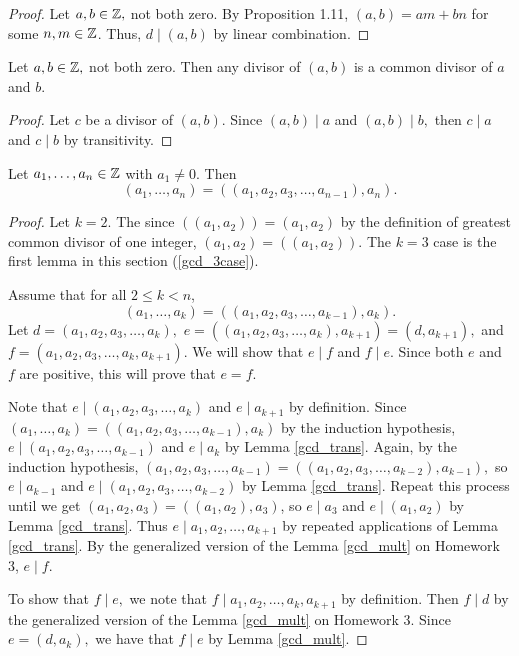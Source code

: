 \documentclass{ximera}
\begin{document}
 \begin{proof}
 	Let $a,b\in\mathbb Z,$ not both zero. By Proposition 1.11, $(a,b)=am+bn$ for some $n,m\in\mathbb Z$. Thus, $d\mid (a,b)$ by linear combination.
 \end{proof}

\begin{lem}\label{gcd_trans}
 	Let $a,b\in\mathbb Z,$ not both zero. Then any divisor of $(a,b)$ is a common divisor of $a$ and $b$.
\end{lem}

\begin{proof}
 Let $c$ be a divisor of $(a,b)$. Since $(a,b)\mid a$ and $(a,b )\mid b,$ then $c\mid a$ and $c\mid b$ by transitivity.
\end{proof}


\begin{prop*}
 Let $a_1,\dots,a_n\in\mathbb Z$ with $a_1\neq 0$.  Then 
	\[(a_1,\dots,a_n)=((a_1,a_2,a_3,\dots,a_{n-1}),a_n).\]
\end{prop*}
\begin{proof}
 Let $k=2$. The since $((a_1,a_2))=(a_1,a_2)$ by the definition of greatest common divisor of one integer,  $(a_1,a_2)=((a_1,a_2))$. The $k=3$ case is the first lemma in this section (\ref{gcd_3case}).
 
 Assume that for all $2\leq k< n$, 
 	\[(a_1,\dots,a_k)=((a_1,a_2,a_3,\dots,a_{k-1}),a_k).\]
Let $d=(a_1,a_2,a_3,\dots,a_{k}),$
$e=((a_1,a_2,a_3,\dots,a_{k}),a_{k+1})=(d,a_{k+1}),$ and $f= (a_1,a_2,a_3,\dots,a_{k},a_{k+1}).$ We will show that $e\mid f$ and $f\mid e$. Since both $e$ and $f$ are positive, this will prove that $e=f$.

Note that $e\mid (a_1,a_2,a_3,\dots,a_{k})$ and $e\mid a_{k+1}$ by definition. 
Since  $(a_1,\dots,a_k)=((a_1,a_2,a_3,\dots,a_{k-1}),a_k)$ by the induction hypothesis, $e\mid(a_1,a_2,a_3,\dots,a_{k-1})$ and $e\mid a_k$ by Lemma \ref{gcd_trans}. Again, by the induction hypothesis, $(a_1,a_2,a_3,\dots,a_{k-1})=((a_1,a_2,a_3,\dots,a_{k-2}),a_{k-1}),$ so $e\mid a_{k-1}$ and $e\mid (a_1,a_2,a_3,\dots,a_{k-2})$ by Lemma \ref{gcd_trans}. Repeat this process until we get $(a_1,a_2,a_3)=((a_1,a_2),a_3)$, so $e\mid a_3$ and $e\mid (a_1,a_2)$ by Lemma \ref{gcd_trans}. Thus $e\mid a_1,a_2,\dots,a_{k+1}$ by repeated applications of Lemma \ref{gcd_trans}. By the generalized version of the Lemma \ref{gcd_mult} on Homework 3, $e\mid f.$

To show that $f\mid e,$ we note that $f\mid a_1,a_2,\dots, a_k,a_{k+1}$ by definition. Then $f\mid d$ by the generalized version of the Lemma \ref{gcd_mult} on Homework 3. Since $e=(d,a_k),$ we have that $f\mid e$ by Lemma \ref{gcd_mult}.
\end{proof} 
\end{document}
